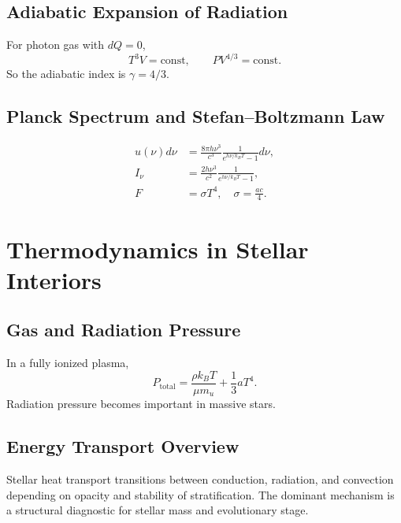 \subsection{Adiabatic Expansion of Radiation}
\begin{theory}
For photon gas with $dQ=0$,
\begin{equation}
    T^3V=\text{const}, \qquad PV^{4/3}=\text{const}.
\end{equation}
So the adiabatic index is $\gamma=4/3$.
\end{theory}

\subsection{Planck Spectrum and Stefan--Boltzmann Law}
\begin{theory}
\begin{align}
    u(\nu)d\nu &= \frac{8\pi h\nu^3}{c^3}\frac{1}{e^{h\nu/k_BT}-1}d\nu, \\
    I_\nu &= \frac{2h\nu^3}{c^2}\frac{1}{e^{h\nu/k_BT}-1}, \\
    F &= \sigma T^4,\quad \sigma=\frac{ac}{4}.
\end{align}
\end{theory}

\section{Thermodynamics in Stellar Interiors}

\subsection{Gas and Radiation Pressure}
\begin{theory}
In a fully ionized plasma,
\begin{equation}
    P_{\text{total}} = \frac{\rho k_B T}{\mu m_u} + \frac{1}{3}aT^4.
\end{equation}
Radiation pressure becomes important in massive stars.
\end{theory}

\subsection{Energy Transport Overview}
\begin{intuition}
Stellar heat transport transitions between conduction, radiation, and convection depending on opacity and stability of stratification.
The dominant mechanism is a structural diagnostic for stellar mass and evolutionary stage.
\end{intuition}


